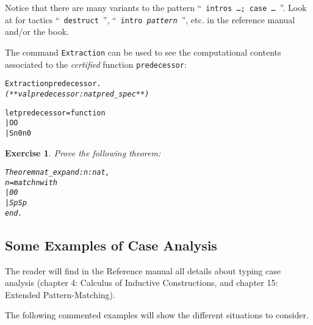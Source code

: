 \documentclass[11pt]{article}
\newcommand{\refmancite}[1]{{}}
\newtheorem{exercise}{Exercise}[section]
\begin{document}
Notice that there are many variants to the pattern ``~\texttt{intros \dots; case \dots}~''. Look at for tactics
``~\texttt{destruct}~'', ``~\texttt{intro \emph{pattern}}~'', etc. in
the reference manual and/or the book.

\noindent The command \texttt{Extraction} \refmancite{Section
\ref{ExtractionIdent}} can be used to see the computational
contents associated to the \emph{certified} function \texttt{predecessor}:
\begin{alltt}
Extraction predecessor.
\it
(** val predecessor : nat {\arrow} pred_spec **)

let predecessor = function
  | O {\arrow} O
  | S n0 {\arrow} n0
\end{alltt}


\begin{exercise} \label{expand}
Prove the following theorem:
\begin{alltt}
Theorem nat_expand : {\prodsym} n:nat,
      n = match n with
                  | 0 {\funarrow} 0
                  | S p {\funarrow} S p
          end.
\end{alltt}
\end{exercise}

\subsection{Some Examples of Case Analysis}
\label{CaseScheme}
The reader will find in the Reference manual all details about
typing case analysis (chapter 4: Calculus of Inductive Constructions,
and chapter 15: Extended Pattern-Matching).

The following commented examples will show the different situations to consider.



\end{document}
